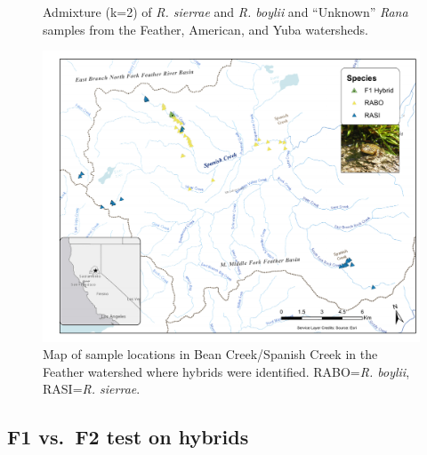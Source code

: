 \documentclass[proquest,12pt,final]{ucthesis-CA2012} %
\begin{document}
\begin{ucmainmatter}
\begin{figure}
{}

\caption{Admixture (k=2) of \emph{R. sierrae} and \emph{R.
boylii} and ``Unknown'' \emph{Rana} samples from the Feather, American,
and Yuba watersheds.}\label{fig:CH2F3admix}
\end{figure}



\begin{figure}

{\centering \includegraphics[angle=90, scale=.70]{figure/ch2/figure_04_hybrid_bean_ck} 

}

\caption{Map of sample locations in Bean Creek/Spanish Creek in
the Feather watershed where hybrids were identified. RABO=\emph{R.
boylii}, RASI=\emph{R. sierrae}.}\label{fig:CH2F4hybmap}
\end{figure}
\clearpage

\hypertarget{f1-vs.f2-test-on-hybrids}{%
\subsection{F1 vs.~F2 test on hybrids}\label{f1-vs.f2-test-on-hybrids}}


\end{ucmainmatter}
\end{document}

